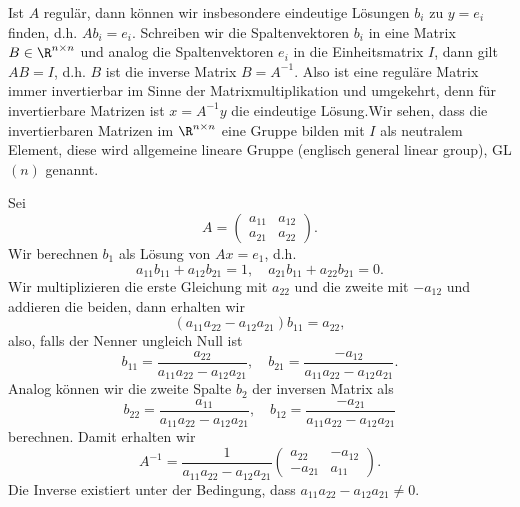 Ist \(A\) regulär, dann können wir insbesondere eindeutige Lösungen \(b_i\) zu \(y=e_i\) finden, d.h. \(A b_i = e_i\). Schreiben wir die Spaltenvektoren \(b_i\) in eine Matrix \(B \in \R^{n \times n}\) und analog die Spaltenvektoren \(e_i\) in die Einheitsmatrix \(I\), dann gilt \(AB=I\), d.h. \(B\) ist die inverse Matrix \(B=A^{-1}\). Also ist eine reguläre Matrix immer invertierbar im Sinne der Matrixmultiplikation und umgekehrt, denn für invertierbare Matrizen ist \(x=A^{-1}y\) die eindeutige Lösung.Wir sehen, dass die invertierbaren Matrizen im \(\R^{n \times n}\) eine Gruppe bilden mit \(I\) als neutralem Element, diese wird allgemeine lineare Gruppe (englisch general linear group), GL\((n)\) genannt.
\label{vektorraeume/LGS:example-9}
\begin{example}{}{}



Sei
\begin{equation*}
 A = \left( \begin{matrix} a_{11} & a_{12} \\ a_{21} & a_{22}  \end{matrix} \right).
\end{equation*}
Wir berechnen \(b_1\) als Lösung von \(Ax = e_1\), d.h.
\begin{equation*}
 a_{11} b_{11} + a_{12} b_{21} = 1, \quad a_{21} b_{11} + a_{22} b_{21} = 0.
\end{equation*}
Wir multiplizieren die erste Gleichung mit \(a_{22}\) und die zweite mit \(-a_{12}\) und addieren die beiden, dann erhalten wir
\begin{equation*}
 (a_{11} a_{22} - a_{12} a_{21}) b_{11} = a_{22},
\end{equation*}
also, falls der Nenner ungleich Null ist
\begin{equation*}
 b_{11} = \frac{a_{22}}{a_{11} a_{22} - a_{12} a_{21}}, \quad b_{21} = \frac{-a_{12}}{a_{11} a_{22} - a_{12} a_{21}}.
\end{equation*}
Analog können wir die zweite Spalte \(b_2\) der inversen Matrix als
\begin{equation*}
 b_{22} = \frac{a_{11}}{a_{11} a_{22} - a_{12} a_{21}}, \quad b_{12} = \frac{-a_{21}}{a_{11} a_{22} - a_{12} a_{21}}\end{equation*}
berechnen. Damit erhalten wir
\begin{equation*}
 A^{-1} = \frac{1}{a_{11} a_{22} - a_{12} a_{21}} \left( \begin{matrix} a_{22} & -a_{12} \\ - a_{21} & a_{11}  \end{matrix} \right).
\end{equation*}
Die Inverse existiert unter der Bedingung, dass \(a_{11} a_{22} - a_{12} a_{21} \neq 0\).
\end{example}


